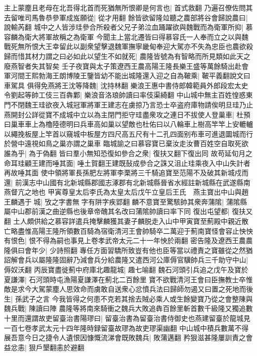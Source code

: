 主上蒙塵且老母在北吾得北首而死猶無所恨卿是何言也|{
	首式救翻}
乃遍召僚佐問其去留唯司馬魯恭參軍成岌願從|{
	從才用翻}
餘皆欲留隆竝聽之農部將谷會歸說農曰|{
	說輸芮翻}
城中之人皆涉珪參合所殺者父兄子弟泣血踊躍欲與魏戰而為衛軍所抑|{
	慕容麟為衛大將軍故稱之為衛軍}
今聞主上當北遷皆曰得慕容氏一人奉而立之以與魏戰死無所恨大王幸留此以副衆望擊退魏軍撫寧畿甸奉迎大駕亦不失為忠臣也農欲殺歸而惜其材力謂之曰必如此以望生不如就死|{
	農隆皆號為有智略而所見類如此天之廢燕智者失其智矣}
壬子夜寶與太子策遼西王農高陽王隆長樂王盛等萬餘騎出赴會軍河間王熙勃海王朗博陵王鑒皆幼不能出城隆還入迎之自為鞁乘|{
	鞁平義翻說文曰車駕具}
俱得免燕將王沈等降魏|{
	沈持林翻}
樂浪王惠中書侍郎韓範員外郎段宏太史令劉起等帥工伎三百犇鄴|{
	樂浪音洛琅帥讀曰率伎渠綺翻}
中山城中無主百姓惶惑東門不閉魏王珪欲夜入城冠軍將軍王建志在虜掠乃言恐士卒盗府庫物請俟明旦珪乃止燕開封公詳從寶不成城中立以為主閉門拒守珪盡衆攻之連日不拔使人登巢車|{
	杜預曰巢車車上為櫓陸德明曰兵車高如巢以望敵也杜佑曰以八輪車上樹高竿竿上安轆轤以繩挽板屋上竿首以窺城中板屋方四尺高五尺有十二孔四面别布車可進退圜城而行於營中遠視如鳥之巢亦謂之巢車}
臨城諭之曰慕容寶已棄汝走汝曹百姓空自取死欲誰為乎|{
	為于偽翻}
皆曰羣小無知恐復如參合之衆|{
	復扶又翻下復出同}
故苟延旬月之命耳珪顧王建而唾其面|{
	唾土賀翻王建既鼔成參合之誅又沮止珪乘夜入中山失計者再故唾其面}
使中領將軍長孫肥左將軍李栗將三千騎追寶至范陽不及破其新城戍而還|{
	前漢志中山國有北新城縣郡國志涿郡有北新城縣晉省水經註新城縣在武遂縣南燕督亢之地也}
甲寅尊皇太后李氏為太皇太后戊午立皇后王氏　燕主寶出中山與趙王麟遇于城|{
	攷之字書無字有阱字疾郢翻}
麟不意寶至驚駭帥其衆奔蒲隂|{
	蒲隂縣屬中山郡前漢之曲逆縣也後章帝醜其名改曰蒲隂帥讀曰率下同}
復出屯望都|{
	復扶又翻}
土人頗供給之慕容詳遣兵掩擊麟獲其妻子麟脱走入山中甲寅寶至薊殿中親近散亡略盡惟高陽王隆所領數百騎為宿衛清河王會帥騎卒二萬迎于薊南寶怪會容止怏怏有恨色|{
	恨不得為嗣也事見上卷孝武帝太元二十一年怏於兩翻}
密告隆及遼西王農農隆俱曰會年少|{
	少詩照翻}
專任方面習驕所致豈有他也臣等當以禮責之寶雖從之然猶詔解會兵以屬隆隆固辭乃減會兵分給農隆又遣西河公庫傉官驥帥兵三千助守中山|{
	傉奴沃翻}
丙辰寶盡徙薊中府庫北趣龍城|{
	趣七喻翻}
魏石河頭引兵追之戊午及寶於夏謙澤|{
	石河頭時屯漁陽夏謙澤在薊北二百餘里}
寶不欲戰清河王會曰臣撫教士卒惟敵是求今大駕蒙塵人思效命而虜敢自送衆心忿憤兵法曰歸師勿遏又曰置之死地而後生|{
	孫武子之言}
今我皆得之何患不克若其捨去賊必乘人或生餘變寶乃從之會整陳與魏兵戰|{
	陳讀曰陣}
農隆等將南來騎衝之魏兵大敗追犇百餘里斬首數千級隆又獨追數十里而還謂故吏留臺治書陽璆曰|{
	留臺治書為留臺治書侍御史也燕建留臺於龍城見一百七卷孝武太元十四年隆時録留臺故璆為故吏璆渠幽翻}
中山城中積兵數萬不得展吾意今日之捷令人遺恨因慷慨流涕會既敗魏兵|{
	敗蒲邁翻}
矜狠滋甚隆屢訓責之會益忿恚|{
	狠戶墾翻恚於避翻}
